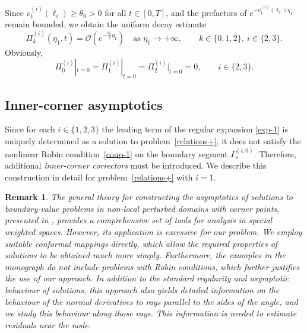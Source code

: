\documentclass[reqno]{amsart}            %
\newtheorem{remark}{Remark}[section]
\numberwithin{equation}{section}
\begin{document}
	
	
	Since $v_1^{(i)}(\ell_i)\ge\theta_0>0$ for all $t\in[0,T]$, and the prefactors
	of $e^{-v_1^{(i)}(\ell_i)\eta_1}$ remain bounded, we obtain the uniform decay
	estimate
	\begin{equation}\label{exp_decay}
		\Pi_k^{(i)}(\eta_1,t)
		= \mathcal{O}\!\left(e^{-\frac{\theta_0}{2}\eta_1}\right)
		\quad\text{as }\eta_1\to+\infty,
		\qquad k\in\{0,1,2\},\ i\in\{2,3\}.
	\end{equation}
	Obviously,
	\begin{equation}\label{in_cond}
		\Pi_0^{(i)}|_{t=0}
		= \Pi_1^{(i)}|_{t=0}
		= \Pi_2^{(i)}|_{t=0}
		= 0,
		\qquad i\in\{2,3\}.
	\end{equation}
	
	
	
	
	\subsection{Inner-corner asymptotics}\label{corner-2-4}
	
	Since for each $i\in\{1,2,3\}$ the leading term of the regular expansion \eqref{exp-1} is uniquely determined 
	as a solution to problem~\eqref{relations+}, it does not 
	satisfy the nonlinear Robin condition~\eqref{coup-1} on the  boundary segment 
	$\Gamma^{(i,0)}_\varepsilon$. Therefore, additional \emph{inner-corner correctors} must be introduced.  
	We describe this construction in detail for problem~\eqref{relations+} with $i=1$.  
	
	\begin{remark}
		The general theory for constructing the asymptotics of solutions to boundary-value problems in non-local perturbed  domains with corner points, presented in \cite[\S 5.5]{Maz-Naz-Pla-2012}, provides a comprehensive set of tools for analysis in special weighted spaces. However, its application is excessive for our problem. We employ suitable conformal mappings directly, which allow the required properties of solutions to be obtained much more simply. Furthermore, the examples in the monograph do not include problems with Robin conditions, which further justifies the use of our approach. In addition to the standard regularity and asymptotic behaviour of solutions, this approach also yields detailed information on the behaviour of the normal derivatives to rays parallel to the sides of the angle, and we study this behaviour along those rays. This information is needed to estimate residuals near the node.
	\end{remark}
	
\end{document}
